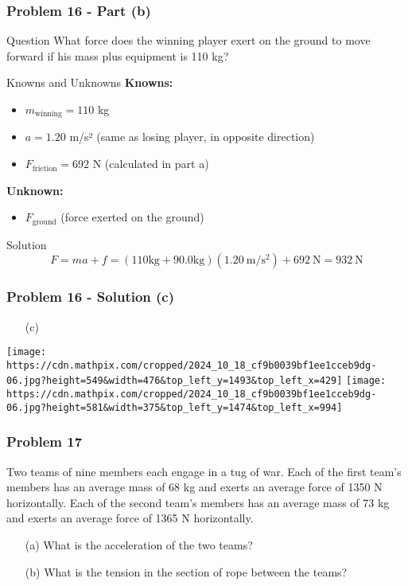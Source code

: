 \documentclass{beamer}
\begin{document}
\begin{frame}
\frametitle{Problem 16 - Part (b)}
\begin{block}{Question}
What force does the winning player exert on the ground to move forward if his mass plus equipment is 110 kg?
\end{block}
\begin{block}{Knowns and Unknowns}
\textbf{Knowns:}
\begin{itemize}
    \item $m_{\text{winning}} = 110$ kg
    \item $a = 1.20$ m/s² (same as losing player, in opposite direction)
    \item $F_{\text{friction}} = 692$ N (calculated in part a)
\end{itemize}
\textbf{Unknown:}
\begin{itemize}
    \item $F_{\text{ground}}$ (force exerted on the ground)
\end{itemize}
\end{block}
\begin{block}{Solution}
\begin{equation*}
F = ma + f = (110 \mathrm{kg} + 90.0 \mathrm{kg})(1.20 \mathrm{~m} / \mathrm{s}^{2}) + 692 \mathrm{~N} = 932 \mathrm{~N}
\end{equation*}
\end{block}
\end{frame}


\begin{frame}
\frametitle{Problem 16 - Solution (c)}
\begin{itemize}
    \item[(c)]
\end{itemize}
\texttt{[image: https://cdn.mathpix.com/cropped/2024\_10\_18\_cf9b0039bf1ee1cceb9dg-06.jpg?height=549\&width=476\&top\_left\_y=1493\&top\_left\_x=429]}
\texttt{[image: https://cdn.mathpix.com/cropped/2024\_10\_18\_cf9b0039bf1ee1cceb9dg-06.jpg?height=581\&width=375\&top\_left\_y=1474\&top\_left\_x=994]}
\end{frame}


\begin{frame}
\frametitle{Problem 17}
Two teams of nine members each engage in a tug of war. Each of the first team's members has an average mass of 68 kg and exerts an average force of 1350 N horizontally. Each of the second team's members has an average mass of 73 kg and exerts an average force of 1365 N horizontally.
\begin{itemize}
    \item[(a)] What is the acceleration of the two teams?
    \item[(b)] What is the tension in the section of rope between the teams?
\end{itemize}
\end{frame}
\end{document}
